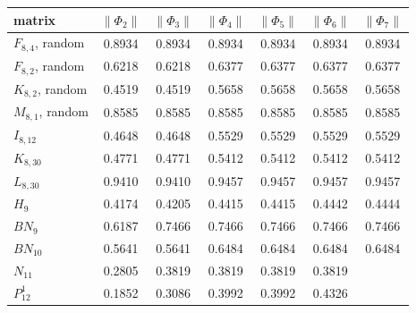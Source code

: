 \documentclass[11pt]{amsart}
\begin{document}
\begin{center}
\small
\begin{tabular}{lcccccc}
\toprule
matrix & $\|\Phi_2\|$ & $\|\Phi_3\|$ & $\|\Phi_4\|$ & $\|\Phi_5\|$ & $\|\Phi_6\|$ & $\|\Phi_7\|$\\
\midrule
$F_{8,4}$, random & 0.8934 & 0.8934 & 0.8934 & 0.8934 & 0.8934 & 0.8934\\
$F_{8,2}$, random & 0.6218 & 0.6218 & 0.6377 & 0.6377 & 0.6377 & 0.6377\\
$K_{8,2}$, random & 0.4519 & 0.4519 & 0.5658 & 0.5658 & 0.5658 & 0.5658\\
$M_{8,1}$, random & 0.8585 & 0.8585 & 0.8585 & 0.8585 & 0.8585 & 0.8585\\
$I_{8,12}$ & 0.4648 & 0.4648 & 0.5529 & 0.5529 & 0.5529 & 0.5529\\
$K_{8,30}$ & 0.4771 & 0.4771 & 0.5412 & 0.5412 & 0.5412 & 0.5412\\
$L_{8,30}$ & 0.9410 & 0.9410 & 0.9457 & 0.9457 & 0.9457 & 0.9457\\
$H_9$ & 0.4174 & 0.4205 & 0.4415 & 0.4415 & 0.4442 & 0.4444\\
$BN_9$ & 0.6187 & 0.7466 & 0.7466 & 0.7466 & 0.7466 & 0.7466\\
$BN_{10}$ & 0.5641 & 0.5641 & 0.6484 & 0.6484 & 0.6484 & 0.6484\\
$N_{11}$ & 0.2805 & 0.3819 & 0.3819 & 0.3819 & 0.3819 & \\
$P_{12}^1$ & 0.1852 & 0.3086 & 0.3992 & 0.3992 & 0.4326 & \\
\bottomrule
\end{tabular}
\end{center}

\medskip
\end{document}
